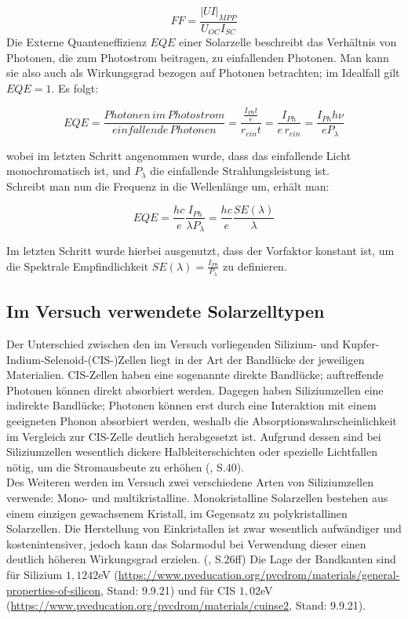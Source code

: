 \begin{equation*}
FF = \frac{|UI|_{MPP}}{U_{OC} I_{SC}}
\end{equation*}
Die Externe Quanteneffizienz $EQE$ einer Solarzelle beschreibt das Verhältnis von Photonen, die zum Photostrom beitragen, zu einfallenden Photonen. Man kann sie also auch als Wirkungsgrad bezogen auf Photonen betrachten; im Idealfall gilt $EQE = 1$. Es folgt:

\begin{equation}
EQE = \frac{Photonen \, im \, Photostrom}{einfallende \, Photonen} = \frac{ \frac{I_{Ph}t}{e}}{r_{ein}t} = \frac{I_{Ph}}{e \, r_{ein}} = \frac{I_{Ph} h \nu}{e P_\lambda}
\end{equation}

wobei im letzten Schritt angenommen wurde, dass das einfallende Licht monochromatisch ist, und $P_\lambda$ die einfallende Strahlungsleistung ist. \\
Schreibt man nun die Frequenz in die Wellenlänge um, erhält man:

\begin{equation}
EQE = \frac{h c}{e} \frac{I_{Ph}}{\lambda P_\lambda} = \frac{h c}{e} \frac{SE(\lambda)}{\lambda}
\end{equation}

Im letzten Schritt wurde hierbei ausgenutzt, dass der Vorfaktor konstant ist, um die Spektrale Empfindlichkeit $SE(\lambda) = \frac{I_{Ph}}{P_\lambda}$ zu definieren.

\subsection{Im Versuch verwendete Solarzelltypen}
Der Unterschied zwischen den im Versuch vorliegenden Silizium- und Kupfer-Indium-Selenoid-(CIS-)Zellen liegt in der Art der Bandlücke der 
jeweiligen Materialien. CIS-Zellen haben eine sogenannte direkte Bandlücke; auftreffende Photonen können direkt absorbiert werden. 
Dagegen haben Siliziumzellen eine indirekte Bandlücke; Photonen können erst durch eine Interaktion mit einem geeigneten Phonon 
absorbiert werden, weshalb die Absorptionswahrscheinlichkeit im Vergleich zur CIS-Zelle deutlich herabgesetzt ist. Aufgrund dessen sind 
bei Siliziumzellen wesentlich dickere Halbleiterschichten oder spezielle Lichtfallen nötig, um die Stromausbeute zu erhöhen 
(\cite{Shah2020}, S.40). \\
Des Weiteren werden im Versuch zwei verschiedene Arten von Siliziumzellen verwende: Mono- und multikristalline. Monokristalline 
Solarzellen bestehen aus einem einzigen gewachsenem Kristall, im Gegensatz zu polykristallinen Solarzellen. Die Herstellung von 
Einkristallen ist zwar wesentlich aufwändiger und kostenintensiver, jedoch kann das Solarmodul bei Verwendung dieser einen deutlich 
höheren Wirkungsgrad erzielen. (\cite{Altekrueger2008}, S.26ff)
Die Lage der Bandkanten sind für Silizium $1,1242$eV 
(\url{https://www.pveducation.org/pvcdrom/materials/general-properties-of-silicon}, Stand: 9.9.21) und für CIS $1,02$eV 
(\url{https://www.pveducation.org/pvcdrom/materials/cuinse2}, Stand: 9.9.21).
 
